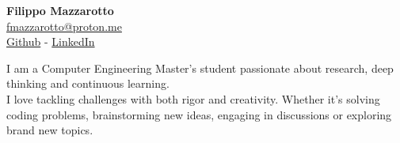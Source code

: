 \documentclass[a4paper,10pt]{article}
\begin{document}
\vfill
\vfill

\begin{minipage}[t]{0.33\textwidth}
    \begin{center} 
        {\huge \textbf{Filippo Mazzarotto}} \\
        \vspace{0.2cm}
        \href{mailto:fmazzarotto+cv@proton.me}{fmazzarotto@proton.me} \\
        \vspace{0.2cm}
        \href{https://github.com/mazzatramp}{Github}
        - \href{https://www.linkedin.com/in/filippo-mazzarotto-214554176/}{LinkedIn} 
    \end{center}

\end{minipage}
\hfill
\begin{minipage}[t]{0.58\textwidth}
    \vspace{-0.45cm}
    \begin{center}
        \begin{minipage}[t]{0.9\textwidth}
            I am a Computer Engineering Master's student passionate about research, deep thinking and continuous learning. \\
                        
            I love tackling challenges with both rigor and creativity. Whether it's solving coding problems, brainstorming new ideas, engaging in discussions or exploring brand new topics. \\
        \end{minipage}
    \end{center}
\end{minipage}

\vfill
\vfill
\end{document}
